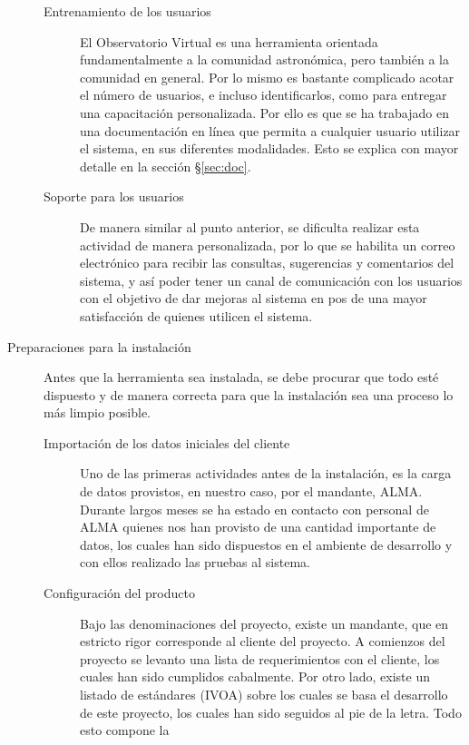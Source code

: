 \begin{description}
\begin{description}
			\item [Entrenamiento de los usuarios] El Observatorio Virtual es una
herramienta orientada fundamentalmente a la comunidad astronómica, pero
tambi\'en a la comunidad en general. Por lo mismo es bastante complicado acotar
el número de usuarios, e incluso identificarlos, como para entregar una
capacitación personalizada. Por ello es que se ha trabajado en una documentación
en línea que permita a cualquier usuario utilizar el sistema, en sus diferentes
modalidades. Esto se explica con mayor detalle en la sección \S\ref{sec:doc}.
			\item [Soporte para los usuarios] De manera similar al punto anterior, se dificulta realizar esta actividad de manera personalizada, por lo que se habilita un correo electrónico\footnotemark{} para recibir las consultas, sugerencias y comentarios del sistema, y así poder tener un canal de comunicación con los usuarios con el objetivo de dar mejoras al sistema en pos de una mayor satisfacción de quienes utilicen el sistema.
		\end{description}
	\item [Preparaciones para la instalación] Antes que la herramienta sea
instalada, se debe procurar que todo est\'e dispuesto y de manera correcta para
que la instalación sea una proceso lo más limpio posible.
		\begin{description}
			\item [Importación de los datos iniciales del cliente] Uno de las
primeras actividades antes de la instalación, es la carga de datos provistos, en
nuestro caso, por el mandante, ALMA. Durante largos meses se ha estado en
contacto con personal de ALMA quienes nos han provisto de una cantidad
importante de datos, los cuales han sido dispuestos en el ambiente de desarrollo
y con ellos realizado las pruebas al sistema.
			\item [Configuración del producto] Bajo las denominaciones del
proyecto, existe un mandante, que en estricto rigor corresponde al cliente del
proyecto. A comienzos del proyecto se levanto una lista de requerimientos con el
cliente, los cuales han sido cumplidos cabalmente. Por otro lado, existe un
listado de estándares (IVOA) sobre los cuales se basa el desarrollo de este
proyecto, los cuales han sido seguidos al pie de la letra. Todo esto compone la

\end{description}
\end{description}
